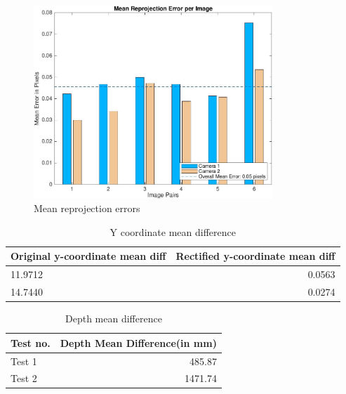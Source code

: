 \begin{figure}[h]
    \centering
    \includegraphics[width=9cm]{Mean_reprojection_error.jpg}
    \caption{Mean reprojection errors}
    \label{fig:result3}
\end{figure}

\begin{table}[h]
    \centering
    \begin{tabular}{lr}
        \toprule
        Original y-coordinate mean diff & Rectified y-coordinate mean diff \\
        \midrule
        11.9712 & 0.0563 \\
        14.7440 & 0.0274 \\
        \bottomrule
    \end{tabular}
    \caption{Y coordinate mean difference}
    \label{tab:table1}
\end{table}

\begin{table}[h]
    \centering
    \begin{tabular}{lr}
        \toprule
        Test no. & Depth Mean Difference(in mm)\\
        \midrule
        Test 1 & 485.87 \\
        Test 2 & 1471.74 \\
        \bottomrule
    \end{tabular}
    \caption{Depth mean difference}
    \label{tab:table2}
\end{table}

